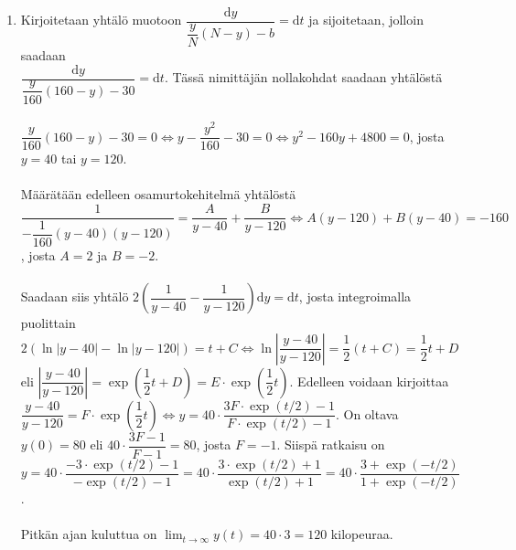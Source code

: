 \documentclass[12pt,fleqn]{article}
\begin{document}
\begin{enumerate}[label=\textbf{\arabic*.}]
\begin{enumerate}[label=\textbf{\alph*)}]
\item Kirjoitetaan yhtälö muotoon \(\dfrac{\text{d}y}{\dfrac{y}{N}(N-y)-b}=\text{d}t\) ja sijoitetaan, jolloin saadaan\\
\(\dfrac{\text{d}y}{\dfrac{y}{160}(160-y)-30}=\text{d}t\). Tässä nimittäjän nollakohdat saadaan yhtälöstä\\
 \\
\(\dfrac{y}{160}(160-y)-30=0\iff y-\dfrac{y^2}{160}-30=0\iff y^2-160y+4800=0\), josta \(y=40\) tai \(y=120\).\\
 \\
Määrätään edelleen osamurtokehitelmä yhtälöstä \(\dfrac{1}{-\dfrac{1}{160}(y-40)(y-120)}=\dfrac{A}{y-40}+\dfrac{B}{y-120}\iff A(y-120)+B(y-40)=-160\), josta \(A=2\) ja \(B=-2\).\\
 \\
Saadaan siis yhtälö \(2\left (\dfrac{1}{y-40}-\dfrac{1}{y-120}\right )\text{d}y=\text{d}t\), josta integroimalla puolittain \(2 (\ln |y-40|-\ln |y-120|)=t+C \iff \ln \left |\dfrac{y-40}{y-120}\right |=\dfrac{1}{2}(t+C)=\dfrac{1}{2}t+D\) eli \(\left |\dfrac{y-40}{y-120}\right |=\exp \left (\dfrac{1}{2}t+D\right )=E\cdot \exp \left (\dfrac{1}{2}t\right )\). Edelleen voidaan kirjoittaa \(\dfrac{y-40}{y-120}=F\cdot \exp \left (\dfrac{1}{2}t\right )\iff y=40\cdot \dfrac{3F\cdot \exp(t/2)-1}{F\cdot \exp(t/2)-1}\). On oltava \(y(0)=80\) eli \(40\cdot \dfrac{3F-1}{F-1}=80\), josta \(F=-1\). Siispä ratkaisu on \(y=40\cdot \dfrac{-3\cdot \exp(t/2)-1}{-\exp(t/2)-1}=40\cdot \dfrac{3\cdot \exp(t/2)+1}{\exp(t/2)+1}=40\cdot \dfrac{3+\exp (-t/2)}{1+\exp (-t/2)}\).\\
\\
Pitkän ajan kuluttua on \(\displaystyle \lim_{t\to \infty} y(t)=40\cdot 3=120\) kilopeuraa.


\end{enumerate}
\end{enumerate}
\end{document}
